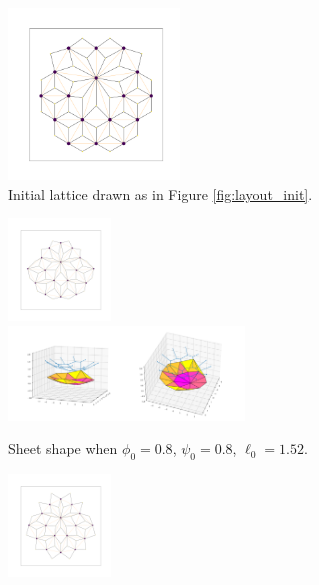 \begin{figure}[htbp]
    \centering
    \begin{subfigure}[b]{\textwidth}
        \centering
        \includegraphics[width=0.5\textwidth]{kink/kink_graph.png}
        \caption{Initial lattice drawn as in Figure \ref{fig:layout_init}.}
        \label{subfig:kink_graph}
    \end{subfigure}
    \begin{subfigure}[b]{\textwidth}
        \centering
        \includegraphics[width=0.3\textwidth]{kink/kink0.8_0.8_1.52_10_graph.png}
        \includegraphics[width=0.69\textwidth]{kink/kink0.8_0.8_1.52_10_plot.png}
        \caption{Sheet shape when $\phi_0=0.8$, $\psi_0=0.8$, $\ell_0=1.52$.}
        \label{subfig:kink_in}
    \end{subfigure}
    \begin{subfigure}[b]{\textwidth}
        \centering
        \includegraphics[width=0.3\textwidth]{kink/kink0.95_0.8_1.52_10_graph.png}

\end{subfigure}
\end{figure}
